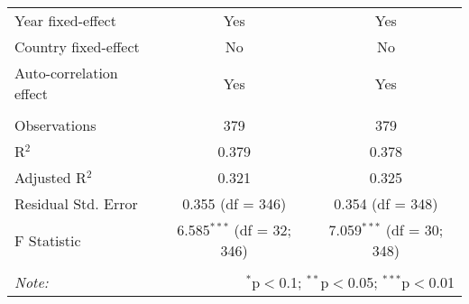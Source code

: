 \begin{table}[!htbp]
\begin{tabular}{@{\extracolsep{5pt}}lcc}
Year fixed-effect & Yes & Yes \\ 
Country fixed-effect & No & No \\ 
Auto-correlation effect & Yes & Yes \\ 
\hline \\[-1.8ex] 
Observations & 379 & 379 \\ 
R$^{2}$ & 0.379 & 0.378 \\ 
Adjusted R$^{2}$ & 0.321 & 0.325 \\ 
Residual Std. Error & 0.355 (df = 346) & 0.354 (df = 348) \\ 
F Statistic & 6.585$^{***}$ (df = 32; 346) & 7.059$^{***}$ (df = 30; 348) \\ 
\hline 
\hline \\[-1.8ex] 
\textit{Note:}  & \multicolumn{2}{r}{$^{*}$p$<$0.1; $^{**}$p$<$0.05; $^{***}$p$<$0.01} \\ 
\end{tabular} 
\end{table} 
